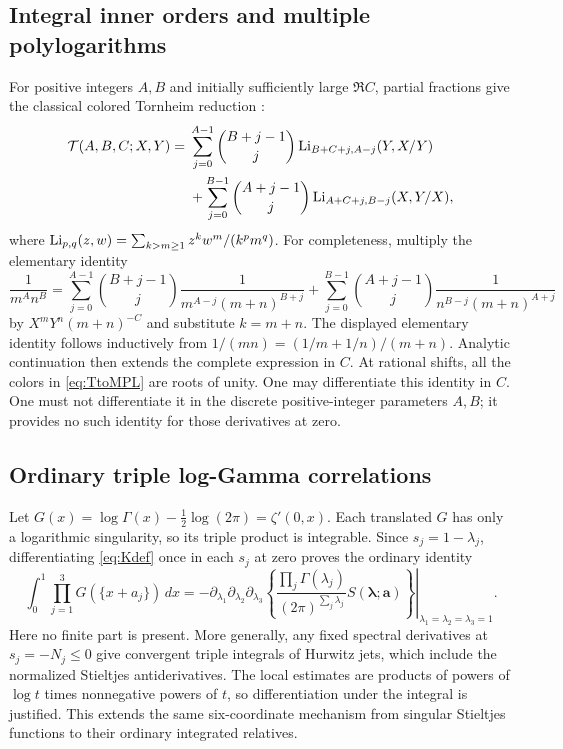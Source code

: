 \subsection{Integral inner orders and multiple polylogarithms}

For positive integers $A,B$ and initially sufficiently large $\Re C$,
partial fractions give the classical colored Tornheim reduction
\cite{zhao-colored}:
\begin{align}\label{eq:TtoMPL}
 \mathcal T(A,B,C;X,Y)
 ={}&\sum_{j=0}^{A-1}\binom{B+j-1}{j}
       \operatorname{Li}_{B+C+j,A-j}(Y,X/Y)\notag\\
 &+\sum_{j=0}^{B-1}\binom{A+j-1}{j}
       \operatorname{Li}_{A+C+j,B-j}(X,Y/X),
\end{align}
where $\operatorname{Li}_{p,q}(z,w)=\sum_{k>m\ge1}z^kw^m/(k^p m^q)$.
For completeness, multiply the elementary identity
\[
 \frac1{m^A n^B}
 =\sum_{j=0}^{A-1}\binom{B+j-1}{j}
       \frac1{m^{A-j}(m+n)^{B+j}}
 +\sum_{j=0}^{B-1}\binom{A+j-1}{j}
       \frac1{n^{B-j}(m+n)^{A+j}}
\]
by $X^mY^n(m+n)^{-C}$ and substitute $k=m+n$.
The displayed elementary identity follows inductively from
$1/(mn)=(1/m+1/n)/(m+n)$.
Analytic continuation then extends the complete expression in $C$.
At rational shifts, all the colors in \eqref{eq:TtoMPL} are roots of
unity.  One may differentiate this identity in $C$.  One must not
differentiate it in the discrete positive-integer parameters $A,B$;
it provides no such identity for those derivatives at zero.

\subsection{Ordinary triple log-Gamma correlations}

Let $G(x)=\log\Gamma(x)-\tfrac12\log(2\pi)=\zeta'(0,x)$.
Each translated $G$ has only a logarithmic singularity, so its triple
product is integrable.  Since $s_j=1-\lambda_j$, differentiating
\eqref{eq:Kdef} once in each $s_j$ at zero proves the ordinary identity
\begin{equation}\label{eq:triple-loggamma}
 \int_0^1\prod_{j=1}^{3}G(\{x+a_j\})\,dx
 =-\left.
 \partial_{\lambda_1}\partial_{\lambda_2}\partial_{\lambda_3}
 \left\{
  \frac{\prod_j\Gamma(\lambda_j)}{(2\pi)^{\sum_j\lambda_j}}
  S(\boldsymbol\lambda;\boldsymbol a)
 \right\}\right|_{\lambda_1=\lambda_2=\lambda_3=1}.
\end{equation}
Here no finite part is present.  More generally, any fixed spectral
derivatives at $s_j=-N_j\le0$ give convergent triple integrals of
Hurwitz jets, which include the normalized Stieltjes antiderivatives.
The local estimates are products of powers of $\log t$ times
nonnegative powers of $t$, so differentiation under the integral is
justified.  This extends the same six-coordinate mechanism from
singular Stieltjes functions to their ordinary integrated relatives.


